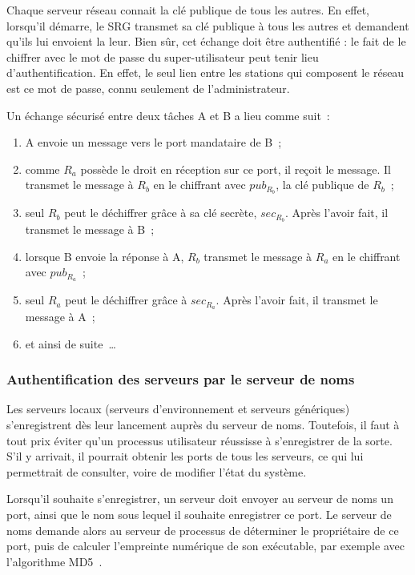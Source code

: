 Chaque serveur r\'eseau connait la cl\'e publique de tous les autres. En effet, lorsqu'il d\'emarre, le SRG transmet sa cl\'e publique \`a tous les autres et demandent qu'ils lui envoient la leur. Bien s\^ur, cet \'echange doit \^etre authentifi\'e : le fait de le chiffrer avec le mot de passe du super-utilisateur peut tenir lieu d'authentification. En effet, le seul lien entre les stations 
qui composent le r\'eseau est ce mot de passe, connu seulement de 
l'administrateur.

Un \'echange s\'ecuris\'e entre deux t\^aches A et B a lieu comme suit~:
\begin{enumerate}
\item A envoie un message vers le port mandataire de B~;
\item comme \(R_{a}\) poss\`ede le droit en r\'eception sur ce port, il re\c{c}oit le message. Il transmet le message \`a \(R_{b}\) en le chiffrant avec \(pub_{{R}_{b}}\), la cl\'e publique de \(R_{b}\)~;
\item seul \(R_{b}\) peut le d\'echiffrer gr\^ace \`a sa cl\'e secr\`ete, \(sec_{{R}_{b}}\). Apr\`es l'avoir fait, il transmet le message \`a B~;
\item lorsque B envoie la r\'eponse \`a A, \(R_{b}\) transmet le message \`a \(R_{a}\) en le chiffrant avec \(pub_{{R}_{a}}\)~;
\item seul \(R_{a}\) peut le d\'echiffrer gr\^ace \`a \(sec_{{R}_{a}}\). Apr\`es l'avoir fait, il transmet le message \`a A~;
\item et ainsi de suite~\dots
\end{enumerate}

\subsubsection{Authentification des serveurs par le serveur de noms}

Les serveurs locaux (serveurs d'environnement et serveurs g\'en\'eriques) s'enregistrent d\`es leur lancement aupr\`es du serveur de noms. Toutefois, il faut \`a tout prix \'eviter qu'un processus utilisateur r\'eussisse \`a s'enregistrer de la sorte. S'il y arrivait, il pourrait obtenir les ports de tous les serveurs, ce qui lui permettrait de consulter, voire de modifier l'\'etat du syst\`eme.

Lorsqu'il souhaite s'enregistrer, un serveur doit envoyer au serveur de noms un port, ainsi que le nom sous lequel il souhaite enregistrer ce port. Le serveur de noms demande alors au serveur de processus de d\'eterminer le propri\'etaire de ce port, puis de calculer l'empreinte num\'erique de son ex\'ecutable, par exemple avec l'algorithme MD5~\cite{Rivest92}. 

